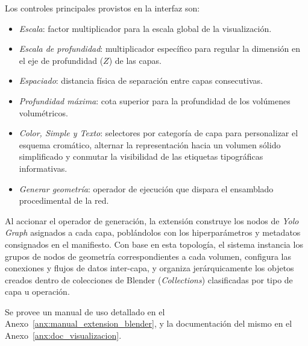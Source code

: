 Los controles principales provistos en la interfaz son:
\begin{itemize}
    \item \textit{Escala}: factor multiplicador para la escala global de la visualización.
    \item \textit{Escala de profundidad}: multiplicador específico para regular la dimensión en el eje 
    de profundidad ($Z$) de las capas.
    \item \textit{Espaciado}: distancia física de separación entre capas consecutivas.
    \item \textit{Profundidad máxima}: cota superior para la profundidad de los volúmenes volumétricos.
    \item \textit{Color, Simple y Texto}: selectores por categoría de capa para personalizar el esquema 
    cromático, alternar la representación hacia un volumen sólido simplificado y conmutar la visibilidad 
    de las etiquetas tipográficas informativas.
    \item \textit{Generar geometría}: operador de ejecución que dispara el ensamblado procedimental de 
    la red.
\end{itemize}

Al accionar el operador de generación, la extensión construye los nodos de \textit{Yolo Graph} asignados 
a cada capa, poblándolos con los hiperparámetros y metadatos consignados en el manifiesto. Con base en 
esta topología, el sistema instancia los grupos de nodos de geometría correspondientes a cada volumen, 
configura las conexiones y flujos de datos inter-capa, y organiza jerárquicamente los objetos creados 
dentro de colecciones de Blender (\textit{Collections}) clasificadas por tipo de capa u operación.
\medskip

Se provee un manual de uso detallado en el Anexo~\ref{anx:manual_extension_blender}, y la documentación del
mismo en el Anexo~\ref{anx:doc_visualizacion}.